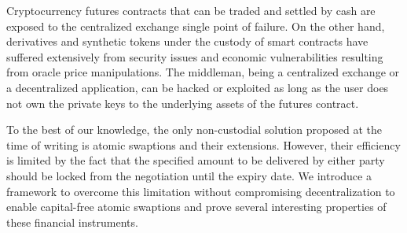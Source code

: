 \label{sec:abstract}
Cryptocurrency futures contracts that can be traded and settled by cash are exposed to the centralized exchange single point of failure. On the other hand, derivatives and synthetic tokens under the custody of smart contracts have suffered extensively from security issues and economic vulnerabilities resulting from oracle price manipulations. The middleman, being a centralized exchange or a decentralized application, can be hacked or exploited as long as the user does not own the private keys to the underlying assets of the futures contract.

To the best of our knowledge, the only non-custodial solution proposed at the time of writing is atomic swaptions and their extensions. However, their efficiency is limited by the fact that the specified amount to be delivered by either party should be locked from the negotiation until the expiry date. We introduce a framework to overcome this limitation without compromising decentralization to enable capital-free atomic swaptions and prove several interesting properties of these financial instruments.